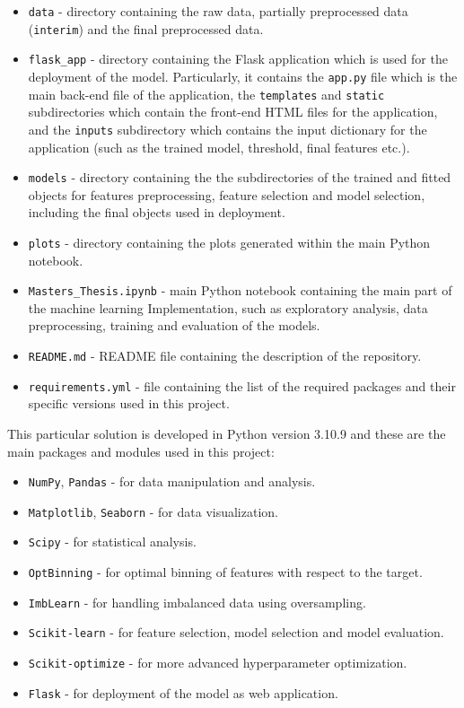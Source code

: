 \begin{itemize}\setlength\itemsep{0em}
\item \texttt{data} - directory containing the raw data, partially preprocessed data (\texttt{interim}) and the final preprocessed data.
\item \texttt{flask\_app} - directory containing the Flask application which is used for the deployment of the model. Particularly, it contains the \texttt{app.py} file which is the main back-end file of the application, the \texttt{templates} and \texttt{static} subdirectories which contain the front-end HTML files for the application, and the \texttt{inputs} subdirectory which contains the input dictionary for the application (such as the trained model, threshold, final features etc.).
\item \texttt{models} - directory containing the the subdirectories of the trained and fitted objects for features preprocessing, feature selection and model selection, including the final objects used in deployment.
\item \texttt{plots} - directory containing the plots generated within the main Python notebook.
\item \texttt{Masters\_Thesis.ipynb} - main Python notebook containing the main part of the machine learning Implementation, such as exploratory analysis, data preprocessing, training and evaluation of the models.
\item \texttt{README.md} - README file containing the description of the repository.
\item \texttt{requirements.yml} - file containing the list of the required packages and their specific versions used in this project.
\end{itemize}

This particular solution is developed in Python version 3.10.9 and these are the main packages and modules used in this project:
\begin{itemize}\setlength\itemsep{0em}
\item \lstinline{NumPy}, \lstinline{Pandas} - for data manipulation and analysis.
\item \lstinline{Matplotlib}, \lstinline{Seaborn} - for data visualization.
\item \lstinline{Scipy} - for statistical analysis.
\item \lstinline{OptBinning} - for optimal binning of features with respect to the target.
\item \lstinline{ImbLearn} - for handling imbalanced data using oversampling.
\item \lstinline{Scikit-learn} - for feature selection, model selection and model evaluation.
\item \lstinline{Scikit-optimize} - for more advanced hyperparameter optimization.
\item \lstinline{Flask} - for deployment of the model as web application.
\end{itemize}

